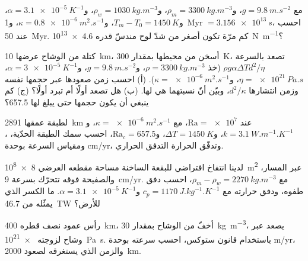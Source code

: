 \begin{exercise}[$\star$]\label{exo:b3:mantle-convection:4}
مع $g = \qty{9.8}{m.s^{-2}}$، و$\rho_m = \qty{3300}{kg.m^{-3}}$، و$\rho_w =
\qty{1030}{kg.m^{-3}}$، و$\alpha = \qty{3.1e-5}{K^{-1}}$، و$T_m - T_0 =
\qty{1450}{K}$، و$\kappa = \qty{0.8e-6}{m^2.s^{-1}}$، و\qty{1}{Myr} $=
\qty{3.156e13}{s}$، احسب  عند \qty{50}{Myr}. كم مرّة
تكون أصغر من شدّ لوح مندسّ قدره \qty{4.6e13}{N.m^{-1}}؟
\end{exercise}

\begin{exercise}[$\star\star$]\label{exo:b3:mantle-convection:5}
كتلة من الوشاح عرضها \qty{10}{km}، أسخن من محيطها بمقدار
\qty{300}{K}، تصعد بالسرعة $\rho g\alpha\Delta Td^2/\eta$ (خذ $\rho =
\qty{3300}{kg.m^{-3}}$، و$g = \qty{9.8}{m.s^{-2}}$، و$\alpha = \qty{3e-5}{K^{-1}}$،
$\eta = \qty{e21}{Pa.s}$، و$\kappa = \qty{e-6}{m^2.s^{-1}}$). (أ) احسب زمن صعودها عبر حجمها نفسه
وزمن انتشارها $d^2/\kappa$، وبيّن
أنّ نسبتهما هي  لها. (ب) هل تصعد أولًا أم تبرد أولًا؟ (ج)
كم ينبغي أن يكون حجمها حتى يبلغ  لها 657.5؟
\end{exercise}

\begin{exercise}[$\star\star$]\label{exo:b3:mantle-convection:6}
لطبقة عمقها \qty{2891}{km} عند $\mathrm{Ra} = \num{e7}$، مع $\kappa =
\qty{e-6}{m^2.s^{-1}}$، و$k = \qty{3.1}{W.m^{-1}.K^{-1}}$، و$\Delta T =
\qty{1450}{K}$، و$\mathrm{Ra}_c = 657.5$، احسب سمك الطبقة الحدّية،
، ومقياس السرعة بوحدة \unit{cm/yr}، وتدفّق الحرارة
التدفق الحراري.
\end{exercise}

\begin{exercise}[$\star\star$]\label{exo:b3:mantle-convection:7}
لدينا انتفاخ افتراضي للبقعة الساخنة مساحة مقطعه العرضي \qty{8e8}{m^2} عبر
المسار، والصفيحة فوقه تتحرّك بسرعة \qty{9}{cm/yr}. مع $\rho_m - \rho_w =
\qty{2270}{kg.m^{-3}}$، احسب دفق طفوه، ودفق حرارته مع $c_p =
\qty{1170}{J.kg^{-1}.K^{-1}}$ و$\alpha = \qty{3.1e-5}{K^{-1}}$. ما الكسر
الذي يمثّله من \qty{46.7}{TW} للأرض؟
\end{exercise}

\begin{exercise}[$\star\star$]\label{exo:b3:mantle-convection:8}
رأس عمود نصف قطره \qty{400}{km}، أخفّ من الوشاح بمقدار
\qty{30}{kg.m^{-3}}، يصعد عبر وشاح لزوجته \qty{e21}{Pa.s}. باستخدام
قانون ستوكس، احسب سرعته بوحدة \unit{m/yr}، والزمن الذي يستغرقه لصعود
\qty{2000}{km}.
\end{exercise}

